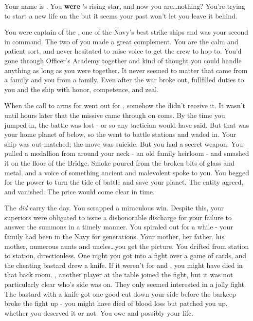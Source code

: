 \documentclass[char]{TMFHope}
\begin{document}
\name{\cCap{}}

Your name is \cCap{}. You {\bf were} \pTMN{}'s rising star, and now you are\ldots nothing? You're trying to start a new life on the \pNew{} but it seems your past won't let you leave it behind. 

You were captain of the \pOld{}, one of the Navy's best strike ships and \cXO{} was your second in command. The two of you made a great complement. You are the calm and patient sort, and \cXO{} never hesitated to raise \cXO{\their} voice to get the crew to hop to. You'd gone through Officer's Academy together and kind of thought you could handle anything as long as you were together. It never seemed to matter that \cXO{} came from a \pEdge{} family and you from a \pPlan{} family. Even after the war broke out, \cXO{\they} fullfilled \cXO{\their} duties to you and the ship with honor, competence, and zeal. 

When the call to arms for went out for \pBattle{}, somehow the \pOld{} didn't receive it. It wasn't until hours later that the  missive came through on coms. By the time you jumped in, the battle was lost - or so any tactician would have said. But that was your home planet of \pHome{} below, so the \pOld{} went to battle stations and waded in. Your ship was out-matched; the move was suicide. But you had a secret weapon. You pulled a medallion from around your neck - an old family heirloom - and smashed it on the floor of the Bridge. Smoke poured from the broken bits of glass and metal, and a voice of something ancient and malevolent spoke to you. You begged for the power to turn the tide of battle and save your planet. The entity agreed, and vanished. The price would come clear in time.

The \pOld{} \emph{did} carry the day. You scrapped a miraculous win. Despite this, your superiors were obligated to issue a dishonorable discharge for your failure to answer the summons in a timely manner. You spiraled out for a while - your family had been in the Navy for generations. Your mother, her father, his mother, numerous aunts and uncles\ldots you get the picture. You drifted from station to station, directionless. One night you got into a fight over a game of cards, and the cheating bastard drew a knife. If it weren't for \cSci{} and \cMed{}, you might have died in that back room. \cSci{}, another player at the table joined the fight, but it was not particularly clear who's side \cSci{\they} was on. They only seemed interested in a jolly fight. The bastard with a knife got one good cut down your side before the barkeep broke the fight up - you might have died of blood loss but \cMed{} patched you up, whether you deserved it or not. You owe \cMed{} and possibly \cSci{} your life.
\end{document}
